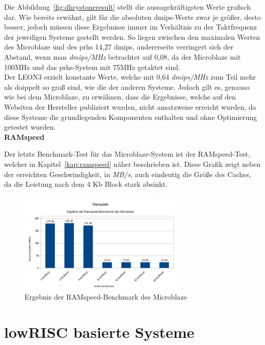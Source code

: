 Die Abbildung~\ref{fig:dhrystoneresult} stellt die aussagekräftigsten Werte grafisch dar. Wie bereits erwähnt, gilt für die absoluten \ac{dmips}-Werte zwar je größer, desto besser, jedoch müssen diese
Ergebnisse immer im Verhältnis zu der Taktfrequenz der jeweiligen Systeme gestellt werden. So liegen zwischen den maximalen Werten des Microblaze und des \ac{prhs} 14,27 \ac{dmips}, andererseits
verringert sich der Abstand, wenn man \emph{\ac{dmips}/MHz} betrachtet auf 0,08, da der Microblaze mit 100MHz und das \ac{prhs}-System mit 75MHz getaktet sind.\\
Der LEON3 erzielt konstante Werte, welche mit 0,64 \emph{\ac{dmips}/MHz} zum Teil mehr als doippelt so groß sind, wie die der anderen Systeme. Jedoch gilt es, genauso wie bei dem Microblaze,
zu erwähnen, dass die Ergebnisse, welche auf den Websiten der Hersteller publiziert wurden, nicht ansatzweise erreicht wurden, da diese Systeme die grundlegenden Komponenten enthalten
und ohne Optimierung getestet wurden.\\

\textbf{RAMspeed}

Der letzte Benchmark-Test für das Microblaze-System ist der RAMspeed-Test, welcher in Kapitel~\ref{kap:ramspeed} näher beschrieben ist. Diese Grafik zeigt neben der
erreichten Geschwindigkeit, in \emph{MB/s}, auch eindeutig die Größe des Caches, da die Leistung nach dem 4 Kb Block stark absinkt.\\


\begin{figure}[H]
\centering
\includegraphics[width=0.7\textwidth]{Hauptteil/ramspeedmicroblaze.png}
\caption{Ergebnis der RAMspeed-Benchmark des Microblaze}
\label{fig:ramspeedmicroblaze}
\end{figure}



\section{lowRISC basierte Systeme}\label{kap:lowrisc}
